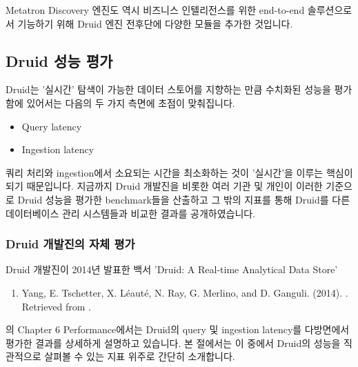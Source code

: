 \documentclass[letterpaper,10pt,english]{sphinxmanual}
\begin{document}
Metatron Discovery 엔진도 역시 비즈니스 인텔리전스를 위한 end-to-end 솔루션으로서 기능하기 위해 Druid 엔진 전후단에 다양한 모듈을 추가한 것입니다.


\subsection{Druid 성능 평가}
\label{\detokenize{discovery/part01/druid_tests:druid}}\label{\detokenize{discovery/part01/druid_tests::doc}}
Druid는 '실시간' 탐색이 가능한 데이터 스토어를 지향하는 만큼 수치화된 성능을 평가함에 있어서는 다음의 두 가지 측면에 초점이 맞춰집니다.
\begin{itemize}
\item {} 
Query latency

\item {} 
Ingestion latency

\end{itemize}

쿼리 처리와 ingestion에서 소요되는 시간을 최소화하는 것이 '실시간'을 이루는 핵심이 되기 때문입니다. 지금까지 Druid 개발진을 비롯한 여러 기관 및 개인이 이러한 기준으로 Druid 성능을 평가한 benchmark들을 산출하고 그 밖의 지표를 통해 Druid를 다른 데이터베이스 관리 시스템들과 비교한 결과를 공개하였습니다.


\subsubsection{Druid 개발진의 자체 평가}
\label{\detokenize{discovery/part01/druid_tests:id1}}
Druid 개발진이 2014년 발표한 백서 'Druid: A Real-time Analytical Data Store'%
\begin{footnote}[1]\sphinxAtStartFootnote
\begin{enumerate}
\def\theenumi{\Alph{enumi}}
\def\labelenumi{\theenumi .}
\makeatletter\def\p@enumii{\p@enumi \theenumi .}\makeatother
\setcounter{enumi}{5}
\item {} 
Yang, E. Tschetter, X. Léauté, N. Ray, G. Merlino, and D. Ganguli. (2014). . Retrieved from .

\end{enumerate}
%
\end{footnote}의 Chapter 6 Performance에서는 Druid의 query 및 ingestion latency를 다방면에서 평가한 결과를 상세하게 설명하고 있습니다. 본 절에서는 이 중에서 Druid의 성능을 직관적으로 살펴볼 수 있는 지표 위주로 간단히 소개합니다.
\end{document}
